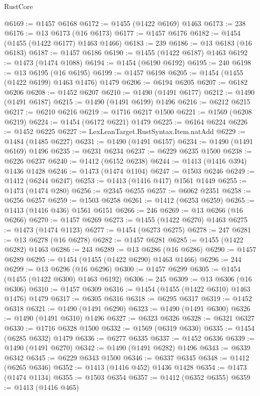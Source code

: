\begin{lexlean}{RustCore}
\begin{coremodule}
@6169 := @1457 @6168
@6172 := @1455 (@1422 @6169) @1463
@6173 := 238
@6176 := @13 @6173 (@16 @6173)
@6177 := @1457 @6176
@6182 := @1454 (@1455 (@1422 @6177) @1463 @1466)
@6183 := 239
@6186 := @13 @6183 (@16 @6183)
@6187 := @1457 @6186
@6190 := @1455 (@1422 @6187) @1463
@6192 := @1473 (@1474 @1088)
@6194 := @1454 (@6190 @6192)
@6195 := 240
@6198 := @13 @6195 (@16 @6195)
@6199 := @1457 @6198
@6205 := @1454 (@1455 (@1422 @6199) @1463 @1476) @1479
@6206 := @6194 @6205
@6207 := @6182 @6206
@6208 := @1452 @6207
@6210 := @1490 (@1491 @6177)
@6212 := @1490 (@1491 @6187)
@6215 := @1490 (@1491 @6199) @1496
@6216 := @6212 @6215
@6217 := @6210 @6216
@6219 := @1716 @6217 @1500
@6221 := @1569 (@6208 @6219)
@6224 := @1454 (@6172 @6221) @1479
@6225 := @6164 @6224
@6226 := @1452 @6225
@6227 := LexLeanTarget.RustSyntax.Item.natAdd
@6229 := @1484 (@1485 @6227)
@6231 := @1490 (@1491 @6157)
@6234 := @1490 (@1491 @6169) @1496
@6235 := @6231 @6234
@6237 := @6229 @6235 @1500
@6238 := @6226 @6237
@6240 := @1412 (@6152 @6238)
@6244 := @1413 (@1416 @394) @1436 @1428
@6246 := @1473 (@1474 @1104)
@6247 := @1503 @6246
@6249 := @1412 (@6244 @6247)
@6253 := @1413 (@1416 @417) @1561 @1449
@6255 := @1473 (@1474 @280)
@6256 := @2345 @6255
@6257 := @6062 @2351
@6258 := @6256 @6257
@6259 := @1503 @6258
@6261 := @1412 (@6253 @6259)
@6265 := @1413 (@1416 @436) @1561 @6151
@6266 := 246
@6269 := @13 @6266 (@16 @6266)
@6270 := @1457 @6269
@6273 := @1455 (@1422 @6270) @1463
@6275 := @1473 (@1474 @1123)
@6277 := @1454 (@6273 @6275)
@6278 := 247
@6281 := @13 @6278 (@16 @6278)
@6282 := @1457 @6281
@6285 := @1455 (@1422 @6282) @1463
@6286 := 243
@6289 := @13 @6286 (@16 @6286)
@6290 := @1457 @6289
@6295 := @1454 (@1455 (@1422 @6290) @1463 @1466)
@6296 := 244
@6299 := @13 @6296 (@16 @6296)
@6300 := @1457 @6299
@6305 := @1454 (@1455 (@1422 @6300) @1463 @6192)
@6306 := 245
@6309 := @13 @6306 (@16 @6306)
@6310 := @1457 @6309
@6316 := @1454 (@1455 (@1422 @6310) @1463 @1476) @1479
@6317 := @6305 @6316
@6318 := @6295 @6317
@6319 := @1452 @6318
@6321 := @1490 (@1491 @6290)
@6323 := @1490 (@1491 @6300)
@6326 := @1490 (@1491 @6310) @1496
@6327 := @6323 @6326
@6328 := @6321 @6327
@6330 := @1716 @6328 @1500
@6332 := @1569 (@6319 @6330)
@6335 := @1454 (@6285 @6332) @1479
@6336 := @6277 @6335
@6337 := @1452 @6336
@6339 := @1490 (@1491 @6270)
@6342 := @1490 (@1491 @6282) @1496
@6343 := @6339 @6342
@6345 := @6229 @6343 @1500
@6346 := @6337 @6345
@6348 := @1412 (@6265 @6346)
@6352 := @1413 (@1416 @452) @1436 @1428
@6354 := @1473 (@1474 @1134)
@6355 := @1503 @6354
@6357 := @1412 (@6352 @6355)
@6359 := @1413 (@1416 @465)

\end{coremodule}
\end{lexlean}
